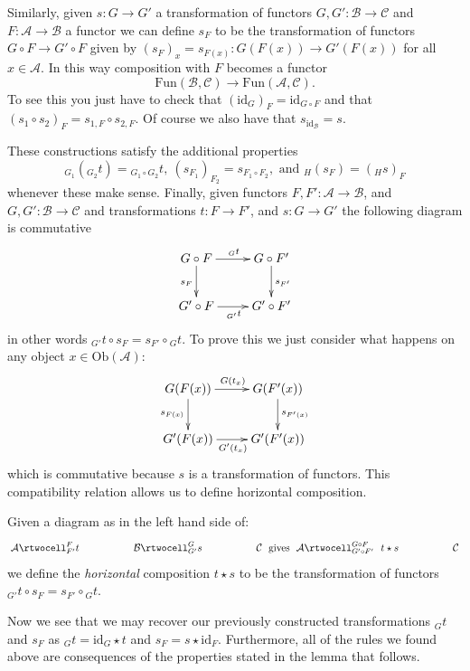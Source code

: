 \medskip\noindent
Similarly, given $s : G \to G'$ a transformation of
functors $G, G' : \mathcal{B} \to \mathcal{C}$ and
$F : \mathcal{A} \to \mathcal{B}$ a functor we can define
$s_F$ to be the transformation of functors
$G\circ F \to G' \circ F$ given by
$(s_F)_x = s_{F(x)} : G(F(x)) \to G'(F(x))$
for all $x \in \mathcal{A}$. In this way
composition with $F$ becomes a functor
$$
\text{Fun}(\mathcal{B}, \mathcal{C})
\longrightarrow
\text{Fun}(\mathcal{A}, \mathcal{C}).
$$
To see this you just have to check that
$(\text{id}_G)_F = \text{id}_{G\circ F}$ and that
$(s_1 \circ s_2)_F = s_{1,F} \circ s_{2,F}$.
Of course we also have that $s_{\text{id}_{\mathcal{B}}} = s$.

\medskip\noindent
These constructions satisfy the additional properties
$$
{}_{G_1}({}_{G_2}t) = {}_{G_1\circ G_2}t,\ 
(s_{F_1})_{F_2} = s_{F_1 \circ F_2}, \text{ and }
{}_H(s_F) = ({}_Hs)_F
$$
whenever these make sense.
Finally, given functors $F, F' : \mathcal{A} \to \mathcal{B}$,
and $G, G' : \mathcal{B} \to \mathcal{C}$ and transformations
$t : F \to F'$, and $s : G \to G'$ the following
diagram is commutative
$$
\xymatrix{
G \circ F \ar[r]^{{}_Gt} \ar[d]_{s_F}
&
G \circ F' \ar[d]^{s_{F'}} \\
G' \circ F \ar[r]_{{}_{G'}t}
&
G' \circ F'
}
$$
in other words ${}_{G'}t \circ s_F =  s_{F'}\circ {}_Gt$.
To prove this we just consider what happens on
any object $x \in \text{Ob}(\mathcal{A})$:
$$
\xymatrix{
G(F(x)) \ar[r]^{G(t_{x})} \ar[d]_{s_{F(x)}}
&
G(F'(x)) \ar[d]^{s_{F'(x)}} \\
G'(F(x)) \ar[r]_{G'(t_{x})}
&
G'(F'(x))
}
$$
which is commutative because $s$ is a transformation
of functors. This compatibility relation allows us
to define horizontal composition.

\begin{definition}
\label{definition-horizontal-composition}
Given a diagram as in the left hand side of:
$$
\xymatrixcolsep{4pc}
\xymatrix{
\mathcal{A}
\rtwocell^F_{F'}{t}
&
\mathcal{B}
\rtwocell^G_{G'}{s}
&
\mathcal{C}
} 
\text{ gives }
\xymatrix{
\mathcal{A}
\rtwocell^{G \circ F} _{G' \circ F'}{\ \ t \star s}
&
\mathcal{C}
}
$$
we define the {\it horizontal} composition $t \star s$ to be the
transformation of functors ${}_{G'}t \circ s_F =  s_{F'}\circ {}_Gt$.
\end{definition}

\noindent
Now we see that we may recover our previously constructed
transformations ${}_Gt$ and $s_F$ as
$ {}_Gt = \text{id}_G \star t $ and $ s_F = s \star \text{id}_F $.
Furthermore, all of the rules we found above are consequences of
the properties stated in the lemma that follows.

